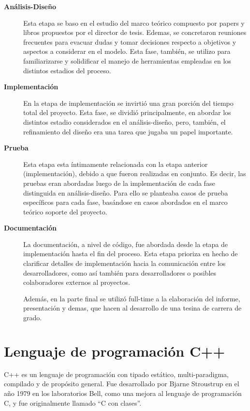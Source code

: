 \begin{description}
\item[\textbf{Análisis-Diseño}] Esta etapa se baso en el estudio del marco teórico compuesto por papers y libros propuestos por el director de tesis. Edemas, se concretaron reuniones frecuentes para evacuar dudas y tomar decisiones respecto a objetivos y aspectos a considerar en el modelo. Esta fase, también, se utilizo para familiarizarse y solidificar el manejo de herramientas empleadas en los distintos estadios del proceso. 

\item[\textbf{Implementación}] En la etapa de implementación se invirtió una gran porción del tiempo total del proyecto. Esta fase, se dividió principalmente, en abordar los distintos estadio considerados en el análisis-diseño, pero, también, el refinamiento del diseño era una tarea que jugaba un papel importante.

\item[\textbf{Prueba}] Esta etapa esta íntimamente relacionada con la etapa anterior (implementación), debido a que fueron realizadas en conjunto. Es decir, las pruebas eran abordadas luego de la implementación de cada fase distinguida en análisis-diseño. Para ello se planteaba casos de prueba específicos para cada fase, basándose en casos abordados en el marco teórico soporte del proyecto.

\item[\textbf{Documentación}] La documentación, a nivel de código, fue abordada desde la etapa de implementación hasta el fin del proceso. Esta etapa prioriza en hecho de clarificar detalles de implementación hacia la comunicación entre los desarrolladores, como así también para desarrolladores o posibles colaboradores externos al proyectos.

Además, en la parte final se utilizó full-time a la elaboración del informe, presentación y demas, que hacen al desarrollo de una tesina de carrera de grado.
\end{description}

\section{Lenguaje de programación C++}
C++ es un lenguaje de programación con tipado estático, multi-paradigma, compilado y de propósito general. Fue desarrollado por Bjarne Stroustrup en el año 1979 en los laboratorios Bell, como una mejora al lenguaje de programación C, y fue originalmente llamado ``C con clases''.

